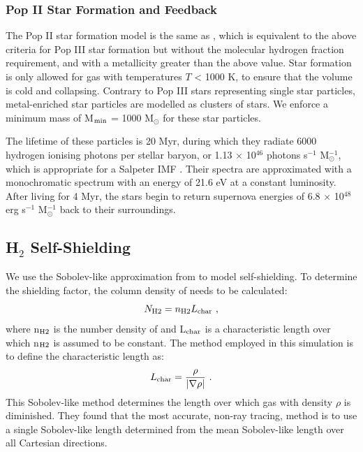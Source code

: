 \documentclass[fleqn,usenatbib]{mnras}
\begin{document}
\subsubsection{Pop II Star Formation and Feedback}
The Pop II star formation model is the same as \citet{Wise09}, which is equivalent to the above criteria for Pop III star formation but without the molecular hydrogen fraction requirement, and with a metallicity greater than the above value. Star formation is only allowed for gas with temperatures $T$ < 1000 K, to ensure that the volume is cold and collapsing. Contrary to Pop III stars representing single star particles, metal-enriched star particles are modelled as clusters of stars. We enforce a minimum mass of M$_{\rm min}$ = 1000 M$_{\odot}$ for these star particles. 

The lifetime of these particles is 20 Myr, during which they radiate 6000 hydrogen ionising photons per stellar baryon, or 1.13 $\times$ 10$^{46}$ photons s$^{-1}$ M$_{\odot}^{-1}$, which is appropriate for a Salpeter IMF \citep{Schaerer03}. Their spectra are approximated with a monochromatic spectrum with an energy of 21.6 eV at a constant luminosity. After living for 4 Myr, the stars begin to return supernova energies of 6.8 $\times$ 10$^{48}$ erg s$^{-1}$ M$_{\odot}^{-1}$ back to their surroundings.

\subsection{\texorpdfstring{H$_2$}{H2} Self-Shielding}
We use the Sobolev-like approximation from \citet{Wolcott11} to model \hh{} self-shielding. To determine the \hh{} shielding factor, the column density of \hh{} needs to be calculated:
\begin{equation} \label{Nh2}
	N_{\rm H2} = n_{\rm H2}L_{\rm char} \ ,
\end{equation}
where n$_{\rm H2}$ is the number density of \hh{} and L$_{\rm char}$ is a characteristic length over which n$_{\rm H2}$ is assumed to be constant. The method employed in this simulation is to define the characteristic length as:
\begin{equation} \label{Lchar}
	L_{\rm char} = \frac{\rho}{|\nabla \rho|} \ . 
\end{equation}
This Sobolev-like method determines the length over which gas with density $\rho$ is diminished. They found that the most accurate, non-ray tracing, method is to use a single Sobolev-like length determined from the mean Sobolev-like length over all Cartesian directions. 
\end{document}
